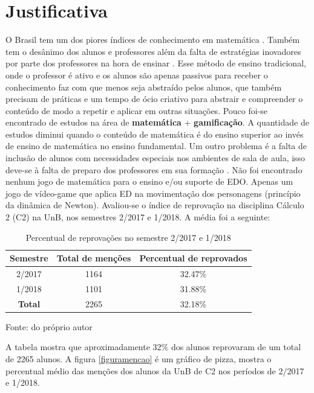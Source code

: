\chapter[Justificativa]{Justificativa}
O Brasil tem um dos piores índices de conhecimento em matemática \cite{indiceRuimMat}. Também tem o desânimo dos alunos e professores além da falta de estratégias inovadores por parte dos professores na hora de ensinar \cite{softwaregamificado}. Esse método de ensino tradicional, onde o professor é ativo e os alunos são apenas passivos para receber o conhecimento faz com que menos seja abstraído pelos alunos, que também precisam de práticas e um tempo de ócio criativo para abstrair e compreender o conteúdo de modo a repetir e aplicar em outras situações. Pouco foi-se encontrado de estudos na área de \textbf{matemática} + \textbf{gamificação}. A quantidade de estudos diminui quando o conteúdo de matemática é do ensino superior ao invés de ensino de matemática no ensino fundamental. 
Um outro problema é a falta de inclusão de alunos com necessidades especiais nos ambientes de sala de aula, isso deve-se à falta de preparo dos professores em sua formação \cite{matEtdah}.
Não foi encontrado nenhum jogo de matemática para o ensino e/ou suporte de EDO. Apenas um jogo de vídeo-game que aplica ED na movimentação dos personagens (princípio da dinâmica de Newton)\cite{videoGameED}.
Avaliou-se o índice de reprovação na disciplina Cálculo 2 (C2) na UnB, nos semestres 2/2017 e 1/2018. A média foi a seguinte:

\begin{table}[H]
\centering
\caption{Percentual de reprovações no semestre 2/2017 e 1/2018}
\begin{tabular}{|c|c|c|}
\hline
Semestre & Total de menções & Percentual de reprovados \\ 
\toprule
2/2017 & 1164 & 32.47\% \\ 
1/2018 & 1101 & 31.88\% \\
\textbf{Total} & 2265 & 32.18\% \\
\hline
\end{tabular}
\label{tabelareprovacaoC2}
\small{Fonte: do próprio autor}
\end{table} 

A tabela mostra que aproximadamente 32\% dos alunos reprovaram de um total de 2265 alunos. 
A figura \ref{figuramencao} é um gráfico de pizza, mostra o percentual médio das menções dos alunos da UnB de C2 nos períodos de 2/2017 e 1/2018.

